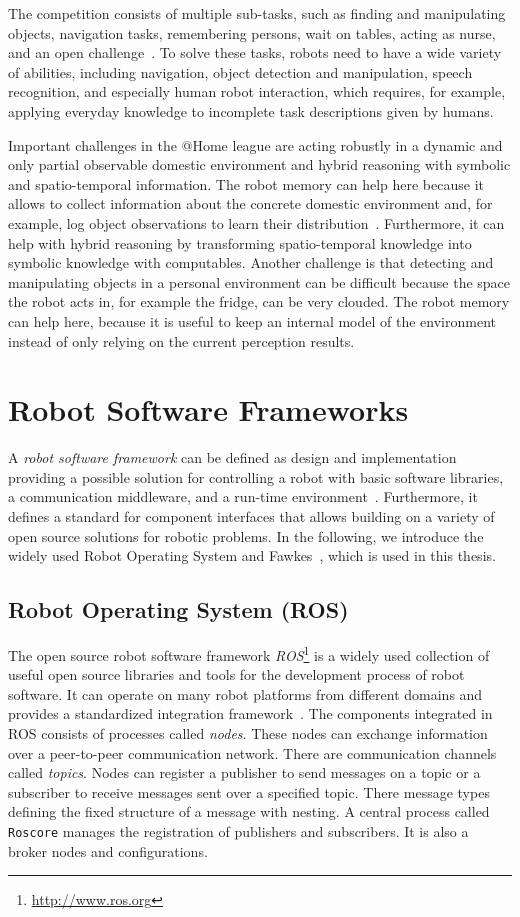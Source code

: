 The competition consists of multiple sub-tasks,
such as finding and manipulating objects, navigation tasks,
remembering persons, wait on tables, acting as
nurse, and an open challenge~\cite{athome-rules}.
To solve these tasks, robots need to
have a wide variety of abilities, including navigation, object
detection and manipulation, speech recognition, and especially human
robot interaction, which requires, for example, applying everyday
knowledge to incomplete task descriptions given by humans.

Important challenges in the @Home league are acting robustly in a
dynamic and only partial observable domestic environment and hybrid
reasoning with symbolic and spatio-temporal information.  The robot
memory can help here because it allows to collect information about
the concrete domestic environment and, for example, log object
observations to learn their distribution~\cite{deebul}.  Furthermore,
it can help with hybrid reasoning by transforming spatio-temporal
knowledge into symbolic knowledge with computables.  Another challenge
is that detecting and manipulating objects in a personal environment
can be difficult because the space the robot acts in, for example the
fridge, can be very clouded. The robot memory can help here, because
it is useful to keep an internal model of the environment instead of
only relying on the current perception results.

\section{Robot Software Frameworks}
\label{sec:robot-software-frameworks}
A \emph{robot software framework} can be defined as design and
implementation providing a possible solution for controlling a robot
with basic software libraries, a communication middleware, and a
run-time environment~\cite{tnthesis,orocos}.
%
Furthermore, it defines a standard for component interfaces that
allows building on a variety of open source solutions for robotic
problems. In the following, we introduce the widely used Robot
Operating System and Fawkes~\cite{Gazsim-Thesis}, which is used in
this thesis.
\subsection{Robot Operating System (ROS)}
\label{sec:ros}
The open source robot software framework
\emph{ROS}\footnote{\url{http://www.ros.org}} is a widely used
collection of useful open source libraries and tools for the
development process of robot software. It can operate on many robot
platforms from different domains and provides a standardized
integration framework~\cite{Ros,ros-book}. The components integrated
in ROS consists of processes called \emph{nodes}. These nodes can
exchange information over a peer-to-peer communication network. There
are communication channels called \emph{topics}. Nodes can register a
publisher to send messages on a topic or a subscriber to receive
messages sent over a specified topic. There message types defining 
the fixed structure of a message with nesting. A central process
called \texttt{Roscore} manages the registration of publishers and
subscribers. It is also a broker nodes and configurations.

